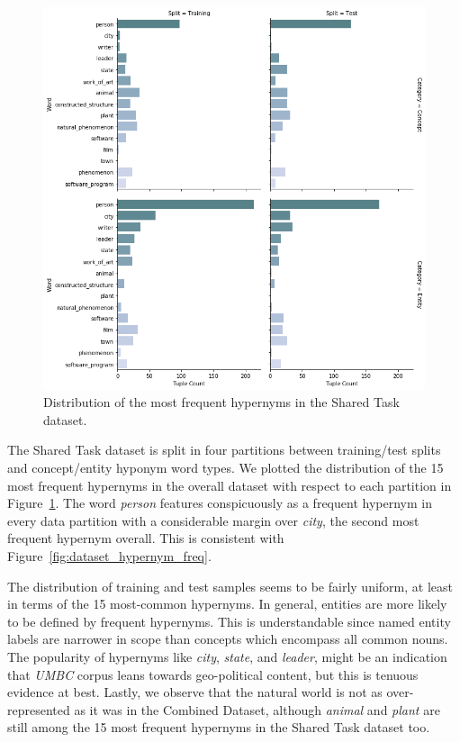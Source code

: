 \begin{figure}[ht!] 
  \centering
  \includegraphics[width=0.75\linewidth]{images/shared_task_MFH.png}
  \caption{Distribution of the most frequent hypernyms in the Shared Task dataset.}
  \label{fig:shared_task_mfh}
\end{figure}
The Shared Task dataset is split in four partitions between training/test splits and concept/entity hyponym word types.  We plotted the distribution of the 15 most frequent hypernyms in the overall dataset with respect to each partition in Figure~\ref{fig:shared_task_mfh}.  The word \textit{person} features conspicuously as a frequent hypernym in every data partition with a considerable margin over \textit{city}, the second most frequent hypernym overall.  This is consistent with Figure~\ref{fig:dataset_hypernym_freq}.

The distribution of training and test samples seems to be fairly uniform, at least in terms of the 15 most-common hypernyms.  In general, entities are more likely to be defined by frequent hypernyms.  This is understandable since named entity labels are narrower in scope than concepts which encompass all common nouns.  The popularity of hypernyms like \textit{city}, \textit{state}, and \textit{leader}, might be an  indication that \textit{UMBC} corpus leans towards geo-political content, but this is tenuous evidence at best.  Lastly, we observe that the natural world is not as over-represented as it was in the Combined Dataset, although \textit{animal} and \textit{plant} are still among the 15 most frequent hypernyms in the Shared Task dataset too.

